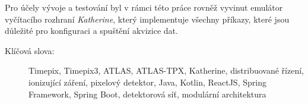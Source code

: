\documentclass[11pt,twoside,a4paper]{book}
\begin{document}
	Pro účely vývoje a testování byl v rámci této práce rovněž vyvinut emulátor vyčítacího rozhraní \textit{Katherine}, který implementuje všechny příkazy, které jsou důležité pro konfiguraci a spuštění akvizice dat.

	\vspace*{2cm}
	\begin{description}
		\item[Klíčová slova:] Timepix, Timepix3, ATLAS, ATLAS-TPX, Katherine, distribuované řízení, ionizující záření, pixelový detektor, Java, Kotlin, ReactJS, Spring Framework, Spring Boot, detektorová síť, modulární architektura
	\end{description}


	\tableofcontents		%
	\listoffigures			%
	\listoftables			%
	\listofcodes			%

	\mainbodystarts












{
\def\CS{$\cal C\kern-0.1667em\lower.5ex\hbox{$\cal S$}\kern-0.075em $}

}


\appendix	


\printnomenclature
\label{apx:zkratky}


\end{document}
